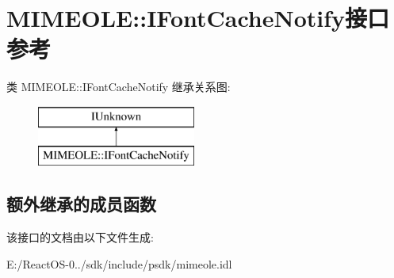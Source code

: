 \hypertarget{interface_m_i_m_e_o_l_e_1_1_i_font_cache_notify}{}\section{M\+I\+M\+E\+O\+LE\+:\+:I\+Font\+Cache\+Notify接口 参考}
\label{interface_m_i_m_e_o_l_e_1_1_i_font_cache_notify}
类 M\+I\+M\+E\+O\+LE\+:\+:I\+Font\+Cache\+Notify 继承关系图\+:\begin{figure}[H]
\begin{center}
\leavevmode
\includegraphics[height=2.000000cm]{interface_m_i_m_e_o_l_e_1_1_i_font_cache_notify}
\end{center}
\end{figure}
\subsection*{额外继承的成员函数}


该接口的文档由以下文件生成\+:\begin{DoxyCompactItemize}
\item 
E\+:/\+React\+O\+S-\/0../sdk/include/psdk/mimeole.\+idl\end{DoxyCompactItemize}
